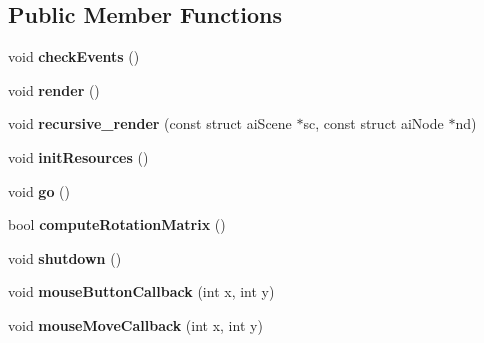 \subsection*{Public Member Functions}
\begin{DoxyCompactItemize}
\item 
\hypertarget{classpho_1_1Engine_a815f596ba518b16632f2e47e8921bf71}{void {\bfseries check\-Events} ()}\label{classpho_1_1Engine_a815f596ba518b16632f2e47e8921bf71}

\item 
\hypertarget{classpho_1_1Engine_a7960743aefd62e846e7f3cd92c18bc73}{void {\bfseries render} ()}\label{classpho_1_1Engine_a7960743aefd62e846e7f3cd92c18bc73}

\item 
\hypertarget{classpho_1_1Engine_ad2fa8d8efa0a9877f5aba94137b8b374}{void {\bfseries recursive\-\_\-render} (const struct ai\-Scene $\ast$sc, const struct ai\-Node $\ast$nd)}\label{classpho_1_1Engine_ad2fa8d8efa0a9877f5aba94137b8b374}

\item 
\hypertarget{classpho_1_1Engine_a4437ae8ba19d5c9800e0155cae37cae7}{void {\bfseries init\-Resources} ()}\label{classpho_1_1Engine_a4437ae8ba19d5c9800e0155cae37cae7}

\item 
\hypertarget{classpho_1_1Engine_a8b35e79b79a49b1e344681183d73bc5b}{void {\bfseries go} ()}\label{classpho_1_1Engine_a8b35e79b79a49b1e344681183d73bc5b}

\item 
\hypertarget{classpho_1_1Engine_a392c7c42460184c3993046a2c877e443}{bool {\bfseries compute\-Rotation\-Matrix} ()}\label{classpho_1_1Engine_a392c7c42460184c3993046a2c877e443}

\item 
\hypertarget{classpho_1_1Engine_a4bbccf668c46064559c99a999f7b9932}{void {\bfseries shutdown} ()}\label{classpho_1_1Engine_a4bbccf668c46064559c99a999f7b9932}

\item 
\hypertarget{classpho_1_1Engine_a2fe85c12b0537175ff02abd425dbaec9}{void {\bfseries mouse\-Button\-Callback} (int x, int y)}\label{classpho_1_1Engine_a2fe85c12b0537175ff02abd425dbaec9}

\item 
\hypertarget{classpho_1_1Engine_aacd64b3ed97712d730fdb660632a49e4}{void {\bfseries mouse\-Move\-Callback} (int x, int y)}\label{classpho_1_1Engine_aacd64b3ed97712d730fdb660632a49e4}


\end{DoxyCompactItemize}
